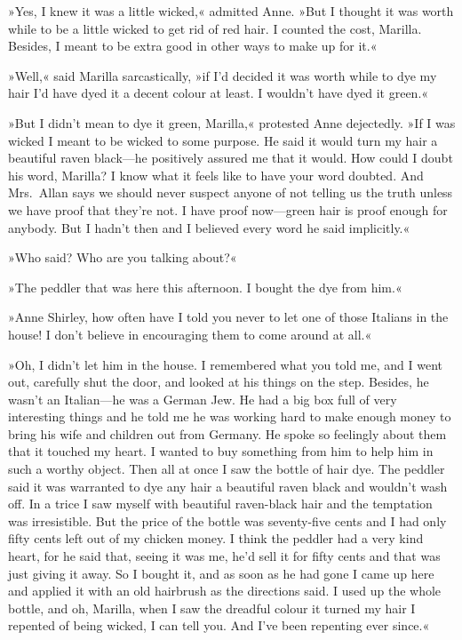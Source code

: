 »Yes, I knew it was a little wicked,« admitted Anne. »But I thought it was worth while to be a little wicked to get rid of red hair. I counted the cost, Marilla. Besides, I meant to be extra good in other ways to make up for it.«

»Well,« said Marilla sarcastically, »if I'd decided it was worth while to dye my hair I'd have dyed it a decent colour at least. I wouldn't have dyed it green.«

»But I didn't mean to dye it green, Marilla,« protested Anne dejectedly. »If I was wicked I meant to be wicked to some purpose. He said it would turn my hair a beautiful raven black—he positively assured me that it would. How could I doubt his word, Marilla? I know what it feels like to have your word doubted. And Mrs.~Allan says we should never suspect anyone of not telling us the truth unless we have proof that they're not. I have proof now—green hair is proof enough for anybody. But I hadn't then and I believed every word he said implicitly.«

»Who said? Who are you talking about?«

»The peddler that was here this afternoon. I bought the dye from him.«

»Anne Shirley, how often have I told you never to let one of those Italians in the house! I don't believe in encouraging them to come around at all.«

»Oh, I didn't let him in the house. I remembered what you told me, and I went out, carefully shut the door, and looked at his things on the step. Besides, he wasn't an Italian—he was a German Jew. He had a big box full of very interesting things and he told me he was working hard to make enough money to bring his wife and children out from Germany. He spoke so feelingly about them that it touched my heart. I wanted to buy something from him to help him in such a worthy object. Then all at once I saw the bottle of hair dye. The peddler said it was warranted to dye any hair a beautiful raven black and wouldn't wash off. In a trice I saw myself with beautiful raven-black hair and the temptation was irresistible. But the price of the bottle was seventy-five cents and I had only fifty cents left out of my chicken money. I think the peddler had a very kind heart, for he said that, seeing it was me, he'd sell it for fifty cents and that was just giving it away. So I bought it, and as soon as he had gone I came up here and applied it with an old hairbrush as the directions said. I used up the whole bottle, and oh, Marilla, when I saw the dreadful colour it turned my hair I repented of being wicked, I can tell you. And I've been repenting ever since.«

